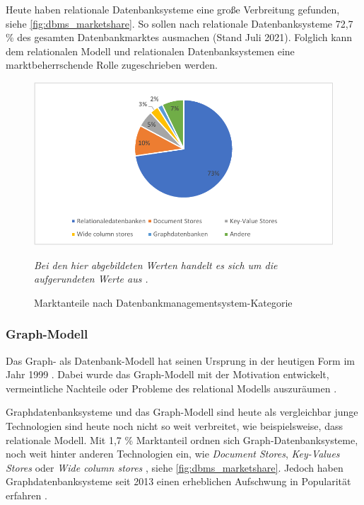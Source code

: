 Heute haben relationale Datenbanksysteme eine große Verbreitung gefunden, siehe \autoref{fig:dbms_marketshare}. So sollen nach \cite{db_engines_ranking_july} relationale Datenbanksysteme 72,7 \% des gesamten Datenbankmarktes ausmachen (Stand Juli 2021). Folglich kann dem relationalen Modell und relationalen Datenbanksystemen eine marktbeherrschende Rolle zugeschrieben werden.

\begin{figure}[ht]
    \centering
    \includegraphics[width=\textwidth]{images/marketshare_dbms.pdf}
    \caption{Marktanteile nach Datenbankmanagementsystem-Kategorie}
    \label{fig:dbms_marketshare}
    \vspace{1em}
    \textit{Bei den hier abgebildeten Werten handelt es sich um die aufgerundeten Werte aus} \cite{db_engines_ranking_july}\textit{.}
\end{figure}

\subsubsection{Graph-Modell}
Das Graph- als Datenbank-Modell hat seinen Ursprung in der heutigen Form im Jahr 1999 \cite{gdbms}. Dabei wurde das Graph-Modell mit der Motivation entwickelt, vermeintliche Nachteile oder Probleme des relational Modells auszuräumen \cite{gdbms}.

Graphdatenbanksysteme und das Graph-Modell sind heute als vergleichbar junge Technologien sind heute noch nicht so weit verbreitet, wie beispielsweise, dass relationale Modell. Mit 1,7 \% Marktanteil ordnen sich Graph-Datenbanksysteme, noch weit hinter anderen Technologien ein, wie \textit{Document Stores}, \textit{Key-Values Stores} oder \textit{Wide column stores} \cite{db_engines_ranking_july}, siehe \autoref{fig:dbms_marketshare}. Jedoch haben Graphdatenbanksysteme seit 2013 einen erheblichen Aufschwung in Popularität erfahren \cite{db_engines_ranking_july}. 

